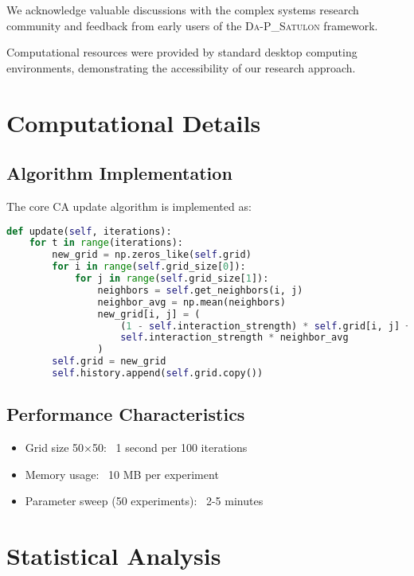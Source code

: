\documentclass[twocolumn,showpacs,preprintnumbers,amsmath,amssymb,prb]{revtex4-2}
\newcommand{\satulon}{\textsc{Da-P\_Satulon}}
\begin{document}
We acknowledge valuable discussions with the complex systems research community and feedback from early users of the \satulon{} framework.

Computational resources were provided by standard desktop computing environments, demonstrating the accessibility of our research approach.




\appendix

\section{Computational Details}
\label{app:computational}

\subsection{Algorithm Implementation}
The core CA update algorithm is implemented as:

\begin{lstlisting}[language=Python, caption=CA-2D Update Algorithm]
def update(self, iterations):
    for t in range(iterations):
        new_grid = np.zeros_like(self.grid)
        for i in range(self.grid_size[0]):
            for j in range(self.grid_size[1]):
                neighbors = self.get_neighbors(i, j)
                neighbor_avg = np.mean(neighbors)
                new_grid[i, j] = (
                    (1 - self.interaction_strength) * self.grid[i, j] + 
                    self.interaction_strength * neighbor_avg
                )
        self.grid = new_grid
        self.history.append(self.grid.copy())
\end{lstlisting}

\subsection{Performance Characteristics}
\begin{itemize}
\item Grid size 50×50: ~1 second per 100 iterations
\item Memory usage: ~10 MB per experiment
\item Parameter sweep (50 experiments): ~2-5 minutes
\end{itemize}

\section{Statistical Analysis}
\label{app:statistics}
\end{document}
